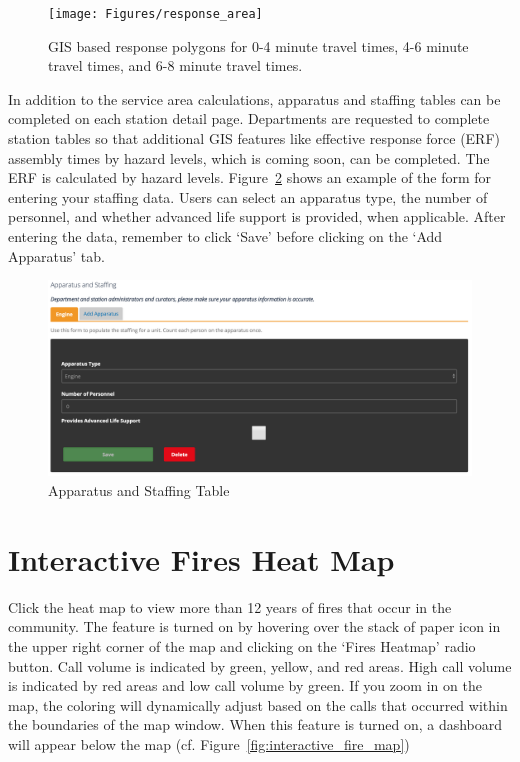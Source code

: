 \documentclass[12pt,oneside]{book}
\begin{document}
\begin{figure}[ht!]
\centering
\texttt{[image: Figures/response\_area]}
\caption{GIS based response polygons for 0-4 minute travel times, 4-6 minute travel times, and 6-8 minute travel times.}
\label{fig:response_area}
\end{figure}

\FloatBarrier

In addition to the service area calculations, apparatus and staffing tables can be completed on each station detail page. Departments are requested to complete station tables so that additional GIS features like effective response force (ERF) assembly times by hazard levels, which is coming soon, can be completed. The ERF is calculated by hazard levels. Figure~\ref{fig:staffing} shows an example of the form for entering your staffing data. Users can select an apparatus type, the number of personnel, and whether advanced life support is provided, when applicable. After entering the data, remember to click `Save' before clicking on the `Add Apparatus' tab.

\begin{figure}[ht!]
\centering
\includegraphics[width=.9\columnwidth]{Figures/staffing}
\caption{Apparatus and Staffing Table}
\label{fig:staffing}
\end{figure}

\FloatBarrier

\section{Interactive Fires Heat Map}

Click the heat map to view more than 12 years of fires that occur in the community. The feature is turned on by hovering over the stack of paper icon in the upper right corner of the map and clicking on the `Fires Heatmap' radio button. Call volume is indicated by green, yellow, and red areas. High call volume is indicated by red areas and low call volume by green. If you zoom in on the map, the coloring will dynamically adjust based on the calls that occurred within the boundaries of the map window. When this feature is turned on, a dashboard will appear below the map (cf. Figure~\ref{fig:interactive_fire_map})
\end{document}
